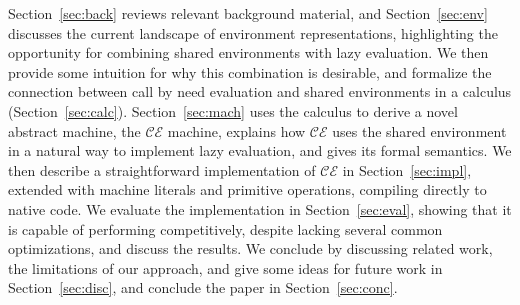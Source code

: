 Section~\ref{sec:back} reviews relevant background material, and
Section~\ref{sec:env} discusses the current landscape of environment
representations, highlighting the opportunity for combining shared environments
with lazy evaluation.  We then provide some intuition for why this combination
is desirable, and formalize the connection between call by need evaluation and
shared environments in a calculus (Section~\ref{sec:calc}).
Section~\ref{sec:mach} uses the calculus to derive a novel abstract machine, the
$\mathcal{CE}$ machine, explains how $\mathcal{CE}$ uses the shared environment
in a natural way to implement lazy evaluation, and gives its formal semantics.
We then describe a straightforward implementation of $\mathcal{CE}$ in
Section~\ref{sec:impl}, extended with machine literals and primitive operations,
compiling directly to native code. We evaluate the implementation in
Section~\ref{sec:eval}, showing that it is capable of performing competitively,
despite lacking several common optimizations, and discuss the results. We
conclude by discussing related work, the limitations of our approach, and give
some ideas for future work in Section~\ref{sec:disc}, and conclude the paper in
Section~\ref{sec:conc}.


